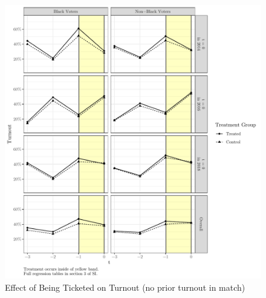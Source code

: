\documentclass[
  12pt,
]{article}
\begin{document}
\begin{figure}[H]

{\centering \includegraphics{compile_files/figure-latex/did-no-prior-1} 

}

\caption{\label{fig:did-1}Effect of Being Ticketed on Turnout (no prior turnout in match)}\label{fig:did-no-prior}
\end{figure}
\end{document}
